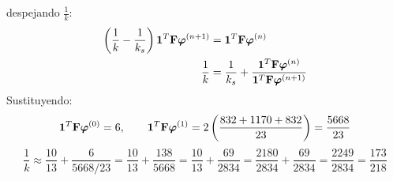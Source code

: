 despejando $\frac1k$:
\begin{align*}
	\left(\frac1k - \frac1{k_s}\right)\bm{1}^T\mathbf{F}\bm{\varphi}^{(n+1)} &= \bm{1}^T\mathbf{F}\bm{\varphi}^{(n)}\\
	\frac1k &= \frac1{k_s} + \frac{\bm{1}^T\mathbf{F}\bm{\varphi}^{(n)}}{\bm{1}^T\mathbf{F}\bm{\varphi}^{(n+1)}}
\end{align*}
Sustituyendo:
\[
\bm{1}^T\mathbf{F}\bm{\varphi}^{(0)} = 6,\qquad
\bm{1}^T\mathbf{F}\bm{\varphi}^{(1)} = 2\left(\frac{832 + 1170 + 832}{23}\right) = \frac{5668}{23}
\]
\[
\frac{1}{k} \approx \frac{10}{13} + \frac{6}{5668/23} = \frac{10}{13} + \frac{138}{5668}
= \frac{10}{13} + \frac{69}{2834} = \frac{2180}{2834} + \frac{69}{2834} = \frac{2249}{2834} = \frac{173}{218}
\]

